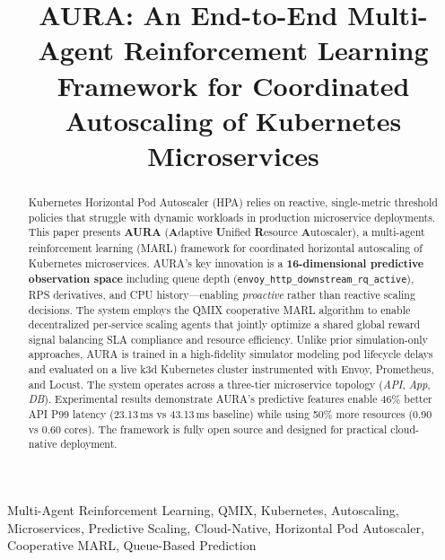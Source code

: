 \documentclass[conference]{IEEEtran}
\begin{document}
\title{AURA: An End-to-End Multi-Agent Reinforcement Learning
Framework for Coordinated Autoscaling of Kubernetes Microservices}

\author{
}

\maketitle

\begin{abstract}
Kubernetes Horizontal Pod Autoscaler (HPA) relies on reactive,
single-metric threshold policies that struggle with dynamic workloads
in production microservice deployments. This paper presents
\textbf{AURA} (\textbf{A}daptive \textbf{U}nified \textbf{R}esource
\textbf{A}utoscaler), a multi-agent reinforcement learning (MARL)
framework for coordinated horizontal autoscaling of Kubernetes
microservices. AURA's key innovation is a \textbf{16-dimensional
predictive observation space} including queue depth
(\texttt{envoy\_http\_downstream\_rq\_active}), RPS derivatives, and
CPU history---enabling \emph{proactive} rather than reactive scaling
decisions. The system employs the QMIX cooperative MARL algorithm to
enable decentralized per-service scaling agents that jointly optimize
a shared global reward signal balancing SLA compliance and resource
efficiency. Unlike prior simulation-only approaches, AURA is trained
in a high-fidelity simulator modeling pod lifecycle delays and
evaluated on a live k3d Kubernetes cluster instrumented with Envoy,
Prometheus, and Locust. The system operates across a three-tier
microservice topology (\textit{API}, \textit{App}, \textit{DB}).
Experimental results demonstrate AURA's predictive features enable
46\% better API P99 latency (23.13\,ms vs 43.13\,ms baseline) while
using 50\% more resources (0.90 vs 0.60 cores). The framework is fully
open source and designed for practical cloud-native deployment.
\end{abstract}

\begin{IEEEkeywords}
Multi-Agent Reinforcement Learning, QMIX, Kubernetes, Autoscaling,
Microservices, Predictive Scaling, Cloud-Native, Horizontal Pod
Autoscaler, Cooperative MARL, Queue-Based Prediction
\end{IEEEkeywords}
\end{document}
